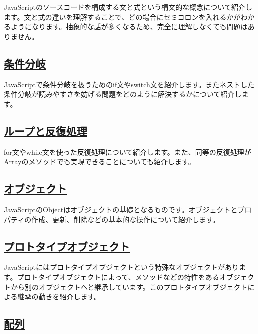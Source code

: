 JavaScriptのソースコードを構成する文と式という構文的な概念について紹介します。文と式の違いを理解することで、どの場合にセミコロンを入れるかがわかるようになります。抽象的な話が多くなるため、完全に理解しなくても問題はありません。

\hypertarget{condition}{%
\subsection*{\texorpdfstring{\href{./condition/README.md}{条件分岐}}{条件分岐}}\label{condition}}

JavaScriptで条件分岐を扱うためのif文やswitch文を紹介します。またネストした条件分岐が読みやすさを妨げる問題をどのように解決するかについて紹介します。

\hypertarget{loop}{%
\subsection*{\texorpdfstring{\href{./loop/README.md}{ループと反復処理}}{ループと反復処理}}\label{loop}}

for文やwhile文を使った反復処理について紹介します。また、同等の反復処理がArrayのメソッドでも実現できることについても紹介します。

\hypertarget{object}{%
\subsection*{\texorpdfstring{\href{./object/README.md}{オブジェクト}}{オブジェクト}}\label{object}}

JavaScriptのObjectはオブジェクトの基礎となるものです。オブジェクトとプロパティの作成、更新、削除などの基本的な操作について紹介します。

\hypertarget{prototype-object}{%
\subsection*{\texorpdfstring{\href{./prototype-object/README.md}{プロトタイプオブジェクト}}{プロトタイプオブジェクト}}\label{prototype-object}}

JavaScriptにはプロトタイプオブジェクトという特殊なオブジェクトがあります。プロトタイプオブジェクトによって、メソッドなどの特性をあるオブジェクトから別のオブジェクトへと継承しています。このプロトタイプオブジェクトによる継承の動きを紹介します。

\hypertarget{array}{%
\subsection*{\texorpdfstring{\href{./array/README.md}{配列}}{配列}}\label{array}}

